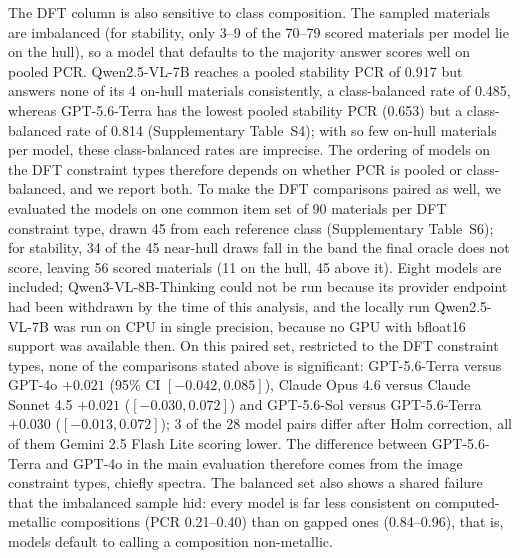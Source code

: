 \documentclass[pdflatex,sn-nature]{sn-jnl}
\newcommand{\rev}[1]{#1}
\newcommand{\rev}[1]{{\color{blue}#1}}
\begin{document}
\rev{The DFT column is also sensitive to class composition. The sampled materials are
imbalanced (for stability, only 3--9 of the 70--79 scored materials per model lie on the hull), so a
model that defaults to the majority answer scores well on pooled PCR. Qwen2.5-VL-7B reaches a pooled
stability PCR of 0.917 but answers none of its 4 on-hull materials consistently, a class-balanced rate
of 0.485, whereas GPT-5.6-Terra has the lowest pooled stability PCR (0.653) but a class-balanced rate of
0.814 (Supplementary Table~S4); with so few on-hull materials per model, these class-balanced rates are
imprecise. The ordering of models on the DFT constraint types therefore depends on whether PCR is pooled
or class-balanced, and we report both. To make the DFT comparisons paired as well, we evaluated the
models on one common item set of 90 materials per DFT constraint type, drawn 45 from each reference
class (Supplementary Table~S6); for stability, 34 of the 45 near-hull draws fall in the band the final
oracle does not score, leaving 56 scored materials (11 on the hull, 45 above it). Eight models are
included; Qwen3-VL-8B-Thinking could not be run because its provider endpoint had been withdrawn by the
time of this analysis, and the locally run Qwen2.5-VL-7B was run on CPU in single precision, because no
GPU with bfloat16 support was available then. On this paired set, restricted to the DFT constraint
types, none of the comparisons stated above is significant: GPT-5.6-Terra versus GPT-4o $+0.021$ (95\% CI
$[-0.042,0.085]$), Claude Opus 4.6 versus Claude Sonnet 4.5 $+0.021$ ($[-0.030,0.072]$) and GPT-5.6-Sol
versus GPT-5.6-Terra $+0.030$ ($[-0.013,0.072]$); 3 of the 28 model pairs differ after Holm correction,
all of them Gemini 2.5 Flash Lite scoring lower. The difference between GPT-5.6-Terra and GPT-4o in the
main evaluation therefore comes from the image constraint types, chiefly spectra. The balanced set also
shows a shared failure that the imbalanced sample hid: every model is far less consistent on
computed-metallic compositions (PCR 0.21--0.40) than on gapped ones (0.84--0.96), that is, models
default to calling a composition non-metallic.}
\end{document}
